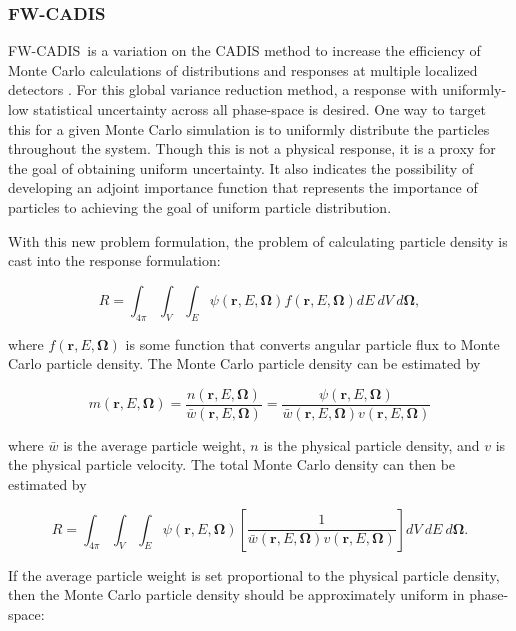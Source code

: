\documentclass{article} %
\newcommand{\bo}{\mathbf\Omega}
\newcommand{\vecr}{\textbf{r}}
\newcommand{\fwc}{\mbox{FW-CADIS}}
\begin{document}
\subsubsection{\fwc}

\fwc\ is a variation on the CADIS method to increase the efficiency of Monte
Carlo calculations of distributions and responses at multiple localized
detectors \cite{fwcadis}.
For this global variance reduction method, a response with uniformly-low
statistical uncertainty across all phase-space is desired. One way to target
this for a given Monte Carlo simulation is to uniformly distribute the
particles throughout the system. Though this is not a physical response, it is
a proxy for the goal of obtaining uniform uncertainty. It also indicates the
possibility of developing an adjoint importance function that represents the
importance of particles to achieving the goal of uniform particle distribution.

With this new problem formulation, the problem of calculating particle density
is cast into the response formulation:

\begin{equation}
R = \int_{4\pi}\int_{V}\int_{E}\psi(\vecr,E,\bo)f(\vecr,E,\bo)dE\ dV\ d\bo,
\end{equation}

\noindent where $f(\vecr,E,\bo)$ is some function that converts angular
particle flux to Monte Carlo particle density. The Monte Carlo particle 
density can be estimated by

\begin{equation}
m(\vecr,E,\bo) = \frac{n(\vecr,E,\bo)}{\bar{w}(\vecr,E,\bo)} 
= \frac{\psi(\vecr,E,\bo)}{\bar{w}(\vecr,E,\bo)v(\vecr,E,\bo)}
\end{equation}

\noindent where $\bar{w}$ is the average particle weight, $n$ is the physical
particle density, and $v$ is the physical particle velocity. The total Monte
Carlo density can then be estimated by

\begin{equation}
R = \int_{4\pi}\int_{V}\int_{E}\psi(\vecr,E,\bo)
\left[\frac{1}{\bar{w}(\vecr,E,\bo)v(\vecr,E,\bo)}\right]dV\ dE\ d\bo.
\label{eq:fwcadis_r}
\end{equation}

If the average particle weight is set proportional to the physical particle
density, then the Monte Carlo particle density should be approximately uniform
in phase-space:
\end{document}
